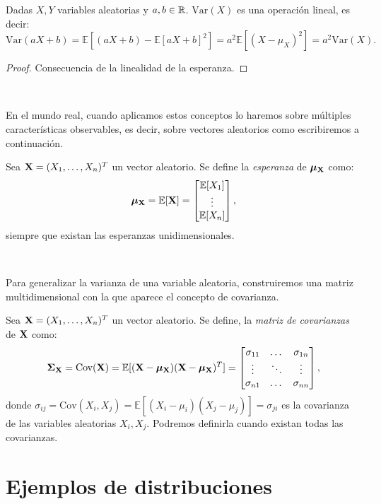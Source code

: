 \documentclass[oneside,openright,titlepage,numbers=noenddot,openany,headinclude,footinclude=true,
cleardoublepage=empty,abstractoff,BCOR=5mm,paper=a4,fontsize=12pt,main=spanish]{scrreprt}
\begin{document}
\begin{proposition}
Dadas $X,Y$ variables aleatorias y $a,b\in \mathbb{R}$. $\text{Var}(X)$ es una operación lineal, es decir: $$\text{Var}(aX+b)=\mathbb{E}[(aX+b)-\mathbb{E}[aX+b]^2]=a^2\mathbb{E}[(X-\mu_X)^2]=a^2\text{Var}(X).$$ 
\end{proposition}

\begin{proof}
Consecuencia de la linealidad de la esperanza.
\end{proof}\

En el mundo real, cuando aplicamos estos conceptos lo haremos sobre múltiples características observables, es decir, sobre vectores aleatorios como escribiremos a continuación.\\

\begin{definition}
Sea $\textbf{X}=(X_1,\dots,X_n)^T$ un vector aleatorio. Se define la \textit{esperanza} de $\bm{\mu_{\textbf{X}}}$ como: $$\bm{\mu_{\textbf{X}}}=\mathbb{E}[\textbf{X}]=\begin{bmatrix}
\mathbb{E}[X_1]\\
\vdots\\
\mathbb{E}[X_n]
\end{bmatrix},$$
siempre que existan las esperanzas unidimensionales.
\end{definition}\

Para generalizar la varianza de una variable aleatoria, construiremos una matriz multidimensional con la que aparece el concepto de covarianza.\\

\begin{definition}
Sea $\textbf{X}=(X_1,\dots,X_n)^T$ un vector aleatorio. Se define, la \textit{matriz de covarianzas} de $\textbf{X}$ como: $$\bm{\Sigma_{\textbf{X}}} = \text{Cov}(\textbf{X})=\mathbb{E}[(\textbf{X}-\bm{\mu_{\textbf{X}}})(\textbf{X}-\bm{\mu_{\textbf{X}}})^T]=\begin{bmatrix}
\sigma_{11} & \dots & \sigma_{1n}\\
\vdots & \ddots & \vdots\\
\sigma_{n1} & \dots & \sigma_{nn}
\end{bmatrix},$$
donde $\sigma_{ij}=\text{Cov}(X_i,X_j)=\mathbb{E}[(X_i-\mu_i)(X_j-\mu_j)]=\sigma_{ji}$ es la covarianza de las variables aleatorias $X_i,X_j$. Podremos definirla cuando existan todas las covarianzas.
\end{definition}

\section{Ejemplos de distribuciones}
\end{document}

